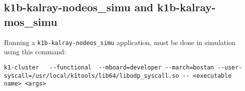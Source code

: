 \documentclass{trkalray}
\begin{document}
\subsection{k1b-kalray-nodeos\_simu and k1b-kalray-mos\_simu}
Running a \texttt{k1b-kalray-nodeos\_simu} application, must be done in
simulation using this command:
\begin{lstlisting}
k1-cluster   --functional  --mboard=developer --march=bostan --user-syscall=/usr/local/k1tools/lib64/libodp_syscall.so -- <executable name> <args>
\end{lstlisting}
\end{document}
